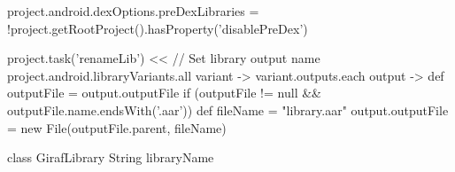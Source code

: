 \begin{gradlecode}[caption=Gradle Plugin to publish libraries (written in Groovy),label=lst:gradle_plugin_library_app,breakatwhitespace=false]
{{{      project.android.dexOptions.preDexLibraries = !project.getRootProject().hasProperty('disablePreDex')
    }

    project.task('renameLib') << {
      // Set library output name
      project.android.libraryVariants.all { variant ->
        variant.outputs.each { output ->
          def outputFile = output.outputFile
          if (outputFile != null && outputFile.name.endsWith('.aar')) {
            def fileName = "library.aar"
            output.outputFile = new File(outputFile.parent, fileName)
          }
        }
      }
    }
  }
}

class GirafLibrary {
  String libraryName
}
\end{gradlecode}